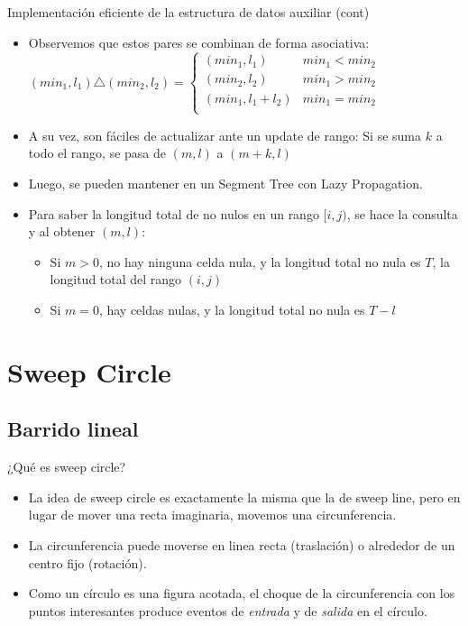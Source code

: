 \documentclass[compress]{beamer}
\begin{document}
\begin{frame}{Implementación eficiente de la estructura de datos auxiliar (cont)}
    \begin{itemize}
        \item Observemos que estos pares se combinan de forma asociativa:
            $(min_1, l_1) \triangle (min_2, l_2) = \left \{ 
             \begin{array}{cc}
              (min_1,l_1)     & min_1 < min_2 \\
              (min_2,l_2)     & min_1 > min_2 \\
              (min_1,l_1+l_2) & min_1 = min_2 \\                                
             \end{array}  \right .$
        \item A su vez, son fáciles de actualizar ante un update de rango: Si se suma $k$ a todo el rango, se pasa de $(m,l)$ a $(m+k,l)$
        \item Luego, se pueden mantener en un Segment Tree con Lazy Propagation.
        \item Para saber la longitud total de no nulos en un rango $[i,j)$, se hace la consulta y al obtener $(m,l)$:
            \begin{itemize}
                \item Si $m > 0$, no hay ninguna celda nula, y la longitud total no nula es $T$, la longitud total del rango $(i,j)$
                \item Si $m = 0$, hay celdas nulas, y la longitud total no nula es $T - l$
            \end{itemize}
    \end{itemize}
\end{frame}


\section{Sweep Circle}

\subsection{Barrido lineal}

\begin{frame}{¿Qu\'e es sweep circle?}
\begin{itemize}
\item La idea de sweep circle es exactamente la misma que la de sweep line, pero en lugar de mover una recta imaginaria, movemos una circunferencia.

\item La circunferencia puede moverse en linea recta (traslación) o alrededor de un centro fijo (rotación).

\item Como un círculo es una figura acotada, el choque de la circunferencia con los puntos interesantes produce eventos de \textit{entrada} y de \textit{salida} en el círculo.
\end{itemize}
\end{frame}
\end{document}
